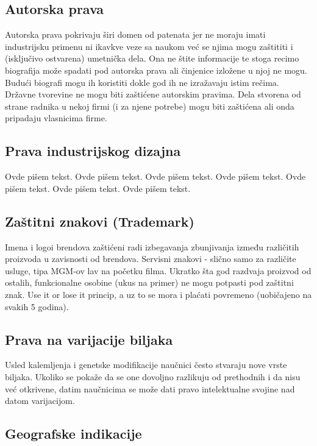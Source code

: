 \documentclass[a4paper]{article}
\begin{document}
\subsection{Autorska prava}
\label{subsec:autorska}

Autorska prava pokrivaju širi domen od patenata jer ne moraju imati industrijsku primenu ni ikavkve veze sa naukom već se njima mogu zaštititi i (isključivo ostvarena) umetnička dela. Ona ne štite informacije te stoga recimo biografija može spadati pod autorska prava ali činjenice izložene u njoj ne mogu. Budući biografi mogu ih koristiti dokle god ih ne izražavaju istim rečima. Državne tvorevine ne mogu biti zaštićene autorskim pravima. Dela stvorena od strane radnika u nekoj firmi (i za njene potrebe) mogu biti zaštićena ali onda pripadaju vlasnicima firme.

\subsection{Prava industrijskog dizajna}
\label{subsec:dizajn}

Ovde pišem tekst. 
Ovde pišem tekst. 
Ovde pišem tekst. 
Ovde pišem tekst. 
Ovde pišem tekst. 
Ovde pišem tekst. 
Ovde pišem tekst. 

\subsection{Zaštitni znakovi (Trademark)}
\label{subsec:trademark}

Imena i logoi brendova zaštićeni radi izbegavanja zbunjivanja između različitih proizvoda u zavisnosti od brendova. Servisni
znakovi - slično samo za različite usluge, tipa MGM-ov lav na početku filma.
Ukratko šta god razdvaja proizvod
od ostalih, funkcionalne osobine (ukus na primer) ne mogu potpasti pod zaštitni znak. Use it or lose it princip, a uz to se mora i plaćati povremeno
(uobičajeno na svakih 5 godina).

\subsection{Prava na varijacije biljaka}
\label{subsec:granje}

Usled kalemljenja i genetske modifikacije naučnici često stvaraju nove vrste biljaka. Ukoliko se pokaže da se one dovoljno razlikuju od prethodnih i da nisu već otkrivene, datim naučnicima se može dati pravo intelektualne svojine nad datom varijacijom.

\subsection{Geografske indikacije}
\label{subsec:geo}
\end{document}

